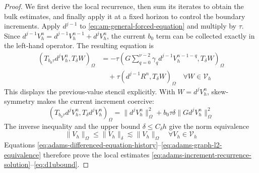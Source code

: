\documentclass[11pt]{article}
\begin{document}
\begin{proof}
We first derive the local recurrence, then sum its iterates to obtain the
bulk estimates, and finally apply it at a fixed horizon to control the
boundary increments.
Apply \(d^{j-1}\) to \eqref{eq:am-general-forced-equation} and multiply by
\(\tau\). Since
\(d^{j-1}V_h^n=d^{j-1}V_h^{n-1}+d^jV_h^n\), the current \(b_0\) term can be
collected exactly in the left-hand operator. The resulting equation is
\begin{align}
(T_{b_0\tau}d^jV_h^n,T_{\delta}W)_{\Omega}
&=-\tau\left(G\sum_{q=0}^{\nu-2}\gamma_q
d^{j-1}V_h^{n-1-q},T_{\delta}W\right)_{\Omega} \label{eq:adams-differenced-equation-history}\\
&\quad+\tau(d^{j-1}R^n,T_{\delta}W)_{\Omega}
\quad \forall W\in\mathcal V_h \label{eq:adams-differenced-equation-forcing}
\end{align}
This displays the previous-value stencil explicitly. With \(W=d^jV_h^n\),
skew-symmetry makes the current increment coercive:
\begin{equation}
(T_{b_0\tau}d^jV_h^n,T_{\delta}d^jV_h^n)_{\Omega}
=\|d^jV_h^n\|_{\Omega}^2
+b_0\tau\delta\|Gd^jV_h^n\|_{\Omega}^2 \label{eq:adams-current-increment-coercivity}
\end{equation}
The inverse inequality and the upper bound \(\delta\le C_{\delta}h\) give
the norm equivalence
\begin{equation}
\|V_h\|_{\Omega}\le\|V_h\|_{\delta}
\lesssim\|V_h\|_{\Omega}\quad \forall V_h\in\mathcal V_h \label{eq:adams-graph-l2-equivalence}
\end{equation}
Equations \eqref{eq:adams-differenced-equation-history}--\eqref{eq:adams-graph-l2-equivalence}
therefore prove the local estimates
\eqref{eq:adams-increment-recurrence-solution}--\eqref{eq:d1ubound}.


\end{proof}
\end{document}
